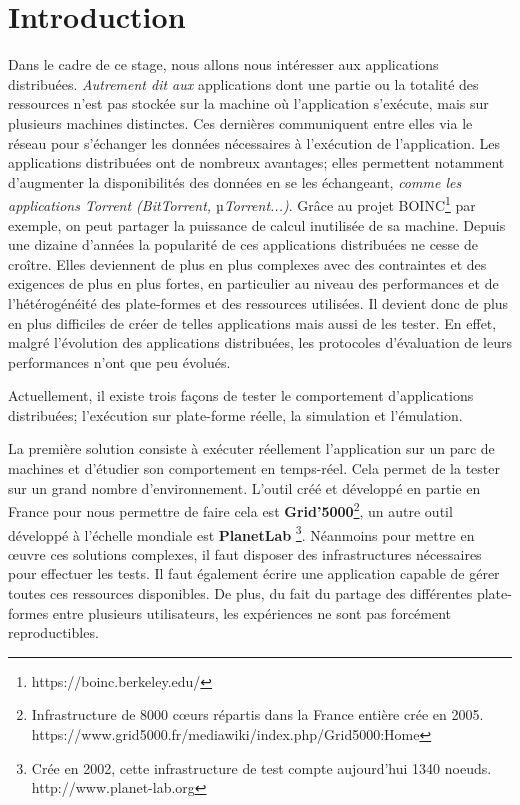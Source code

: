 \section{Introduction}



Dans le cadre de ce stage, nous allons nous intéresser aux applications distribuées. \textit{ Autrement dit aux} applications dont une partie ou la totalité des ressources  n'est pas stockée sur la machine où l'application s'exécute, mais sur plusieurs machines distinctes. Ces dernières communiquent entre elles via le réseau pour s'échanger les données nécessaires à l'exécution de l'application. Les applications distribuées ont de nombreux avantages; elles permettent notamment d'augmenter la disponibilités des données en se les échangeant,\textit{ comme les applications Torrent (BitTorrent, $µ$Torrent...)}. Grâce au projet BOINC\footnote{https://boinc.berkeley.edu/} par exemple, on peut partager la puissance de calcul inutilisée de sa machine. Depuis une dizaine d'années la popularité de ces applications distribuées ne cesse de croître. Elles deviennent de plus en plus complexes avec des contraintes et des exigences de plus en plus fortes, en particulier au niveau des performances et de l'hétérogénéité des plate-formes et des ressources utilisées. Il devient donc de plus en plus difficiles de créer de telles applications mais aussi de les tester. En effet, malgré l'évolution des applications distribuées, les protocoles d'évaluation de leurs performances n'ont que peu évolués.

Actuellement, il existe trois façons de tester le comportement d'applications distribuées; l'exécution sur plate-forme réelle, la simulation et l'émulation. 

La première solution consiste à exécuter réellement l'application sur un parc de machines et d'étudier son comportement en temps-réel. Cela permet de la tester sur un grand nombre d'environnement. L'outil créé et développé en partie en France pour nous permettre de faire cela est \textbf{Grid'5000}\footnote{Infrastructure de 8000 c\oe urs répartis dans la France entière crée en 2005. \\ https://www.grid5000.fr/mediawiki/index.php/Grid5000:Home}\cite{GRID5000}, un autre outil développé à l'échelle mondiale est \textbf{PlanetLab} \footnote{Crée en 2002, cette infrastructure de test compte aujourd'hui 1340 noeuds. \\ http://www.planet-lab.org}. Néanmoins pour mettre en \oe uvre ces solutions complexes, il faut disposer des infrastructures nécessaires pour effectuer les tests. Il faut également écrire une application capable de gérer toutes ces ressources disponibles. De plus, du fait du partage des différentes plate-formes entre plusieurs utilisateurs, les expériences ne sont pas forcément reproductibles. 

